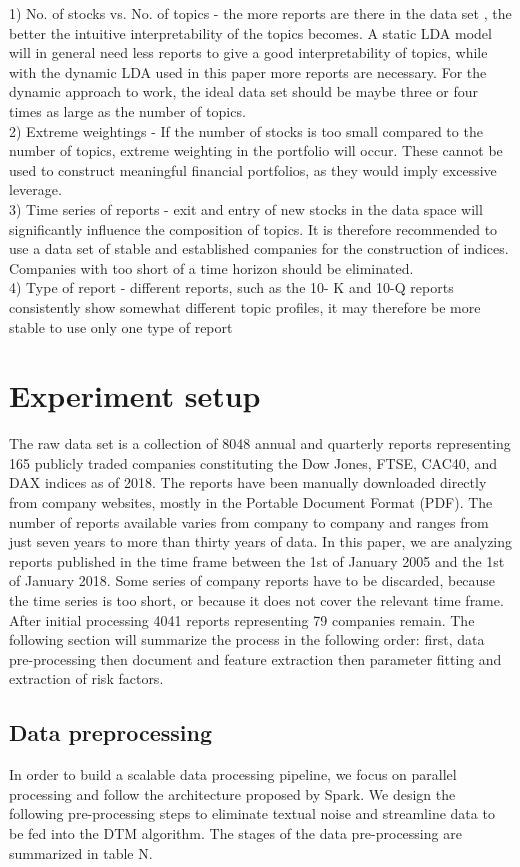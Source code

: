 \documentclass[12pt,journal,letterpaper,oneside,onecolumn]{IEEEtran}
\begin{document}
1) No. of stocks vs. No. of topics - the more reports are there in the data set , the better the intuitive interpretability of the topics becomes. A static LDA model will in general need less reports to give a good interpretability of topics, while with the dynamic LDA used in this paper more reports are necessary. For the dynamic approach to work, the ideal data set should be maybe three or four times as large as the number of topics.
\\
2) Extreme weightings - If the number of stocks is too small compared to the number of topics, extreme weighting in the portfolio will occur. These cannot be used to construct meaningful financial portfolios, as they would imply excessive leverage.
\\
3) Time series of reports - exit and entry of new stocks in the data space will significantly influence the composition of topics. It is therefore recommended to use a data set of stable and established companies for the construction of indices. Companies with too short of a time horizon should be eliminated.
\\
4) Type of report - different reports, such as the 10- K and 10-Q  reports consistently show somewhat different topic profiles, it may therefore be  more stable to use only one type of report


\section{Experiment setup}
The raw data set is a collection of 8048 annual and quarterly reports representing 165 publicly traded companies constituting the Dow Jones, FTSE, CAC40, and DAX indices as of 2018. The reports have been manually downloaded directly from  company websites, mostly in the Portable Document Format (PDF). The number of reports available varies from company to company and ranges from just seven years to more than thirty years of data. In this paper, we are analyzing reports published in the time frame between the 1st of January 2005 and the 1st of January 2018. Some series of company reports have to be discarded, because the time series is too short, or because it does not cover the relevant time frame. After initial processing 4041 reports representing 79 companies remain. 
The following section will summarize the process in the following order: first, data pre-processing then document and feature extraction then parameter fitting and extraction of risk factors.

\subsection{Data preprocessing}
In order to build a scalable data processing pipeline, we focus on parallel processing and follow the architecture proposed by Spark\cite{ref_finnum_spark}. We design the following pre-processing steps to eliminate textual noise and streamline data to be fed into the DTM algorithm. The stages of the data pre-processing are summarized in table N. 
\end{document}
